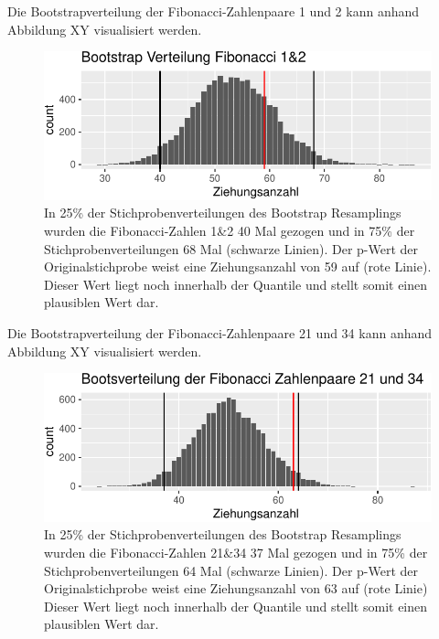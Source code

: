 \documentclass[ngerman,]{article}
\begin{document}
Die Bootstrapverteilung der Fibonacci-Zahlenpaare 1 und 2 kann anhand
Abbildung XY visualisiert werden.

\begin{figure}

\includegraphics{Abbildung/Bootstrap_1_2-1} \hfill{}

\caption{In 25\% der Stichprobenverteilungen des Bootstrap Resamplings wurden die Fibonacci-Zahlen 1\&2 40 Mal gezogen und in 75\% der Stichprobenverteilungen 68 Mal (schwarze Linien). Der p-Wert der Originalstichprobe weist eine Ziehungsanzahl von 59 auf (rote Linie). Dieser Wert liegt noch innerhalb der Quantile und stellt somit einen plausiblen Wert dar.}\label{fig:Bootstrap_1_2}
\end{figure}

Die Bootstrapverteilung der Fibonacci-Zahlenpaare 21 und 34 kann anhand
Abbildung XY visualisiert werden.

\begin{figure}

\includegraphics{Abbildung/Bootstrap_21_34-1} \hfill{}

\caption{In 25\% der Stichprobenverteilungen des Bootstrap Resamplings wurden die Fibonacci-Zahlen 21\&34 37 Mal gezogen und in 75\% der Stichprobenverteilungen 64 Mal (schwarze Linien). Der p-Wert der Originalstichprobe weist eine Ziehungsanzahl von 63 auf (rote Linie) Dieser Wert liegt noch innerhalb der Quantile und stellt somit einen plausiblen Wert dar.}\label{fig:Bootstrap_21_34}
\end{figure}
\end{document}

